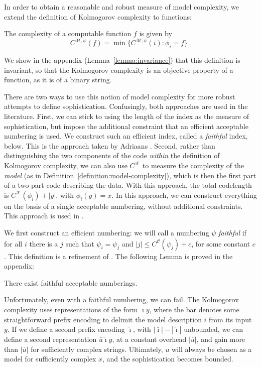 \documentclass{style/llncs}
\newcommand{\M}{\mathscr M}
\newcommand{\C}{\mathscr C}
\newcommand{\K}{\mathscr K}
\newcommand{\br}[1]{\overline{#1}}
\newcommand{\p}{\,\text{.}}
\begin{document}
In order to obtain a reasonable and robust measure of model complexity, we extend the definition of Kolmogorov complexity to functions:

\begin{definition}\label{definition:model-complexity}
The complexity of a computable function $f$ is given by 
\[
C^{\M,\psi}(f) = \min\{C^{\M,\psi}(i):\phi_i=f\}\p
\]
\end{definition}
We show in the appendix (Lemma~\ref{lemma:invariance}) that this definition is invariant, so that the Kolmogorov complexity is an objective property of a function, as it is of a binary string.

There are two ways to use this notion of model complexity for more robust attempts to define sophistication. Confusingly, both approaches are used in the literature. First, we can stick to using the length of the index as the measure of sophistication, but impose the additional constraint that an efficient acceptable numbering is used. We construct such an efficient index, called a \emph{faithful} index, below. This is the approach taken by Adriaans \cite{adriaans2012facticity}.
Second, rather than distinguishing the two components of the code \emph{within} the definition of Kolmogorov complexity, we can also use $C^\K$ to measure the complexity of the \emph{model} (as in Definition~\ref{definition:model-complexity}), which is then the first part of a two-part code describing the data. With this approach, the total codelength is $C^\K(\phi_i)+|y|$, with $\phi_i(y)=x$. In this approach, we can construct everything on the basis of a single acceptable numbering, without additional constraints. This approach is used in  \cite{cover1985kolmogorov,gacs2001algorithmic,vitanyi2004meaningful,gellmann1996information}.

We first construct an efficient numbering: we will call a numbering $\psi$ \emph{faithful} if for all $i$ there is a $j$ such that $\psi_i=\psi_j$ and $|j|\le C^{\C}(\psi_j)+c$, for some constant $c$. This definition is a refinement of \cite[Definition~10]{adriaans2012facticity}. The following Lemma is proved in the appendix:

\begin{lemma}
There exist faithful acceptable numberings.
\end{lemma}
Unfortunately, even with a faithful numbering, we can fail. The Kolmogorov complexity uses representations of the form $\bar\imath y$, where the bar denotes some straightforward prefix encoding to delimit the model description $i$ from its input $y$. If we define a second prefix encoding $\tilde{\imath}$, with $|\bar\imath|-|\tilde\imath|$ unbounded, we can define a second representation $\bar u \tilde \imath y$, at a constant overhead $|\br{u}|$, and gain more than $|\br{u}|$ for sufficiently complex strings. Ultimately, $u$ will always be chosen as a model for sufficiently complex $x$, and the sophistication becomes bounded.
\end{document}
